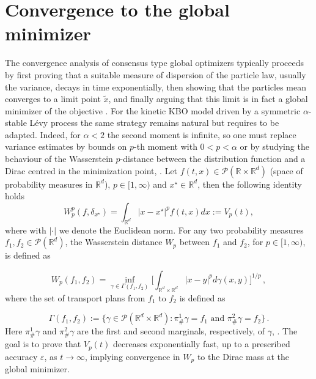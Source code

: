 \documentclass[11pt,handout]{article}%
\numberwithin{equation}{section}
\newcommand{\R}{\mathbb R}
\theoremstyle{definition}
\begin{document}
\section{Convergence to the global minimizer}\label{sec:convergence} 
The convergence analysis of consensus type global optimizers typically proceeds by first proving that a suitable measure of dispersion of the particle law, usually the variance,   decays in time exponentially, then showing that the particles mean converges to a limit point $\tilde{x}$, and finally arguing that this limit is in fact a global minimizer of the objective \cite{PTTM2017,benfenati2022binary}. 
For the kinetic KBO model driven by a symmetric $\alpha$-stable L\'evy process the same strategy remains natural but requires to be adapted. Indeed, for $\alpha<2$ the second moment is infinite, so one must replace variance estimates by bounds on $p$-th moment with $0<p<\alpha$ or by studying the behaviour of the Wasserstein $p$-distance between the distribution function and a Dirac centred in the minimization point, \cite{fornasier2024consensus}. Let $f(t,x) \in \mathcal{P}(\R\times \R^d)$ (space of probability measures in $\R^d$), $p \in [1, \infty)$ and $x^\star \in \R^d$, then the following identity holds
\begin{equation}\label{eq:Vp}
	W_p^p(f,\delta_{x^\star}) =   \int_{\R^d} |x - x^\star|^p f(t,x) dx := V_p(t),
\end{equation}
where with $\vert\cdot \vert$ we denote the Euclidean norm.
For any two probability measures $f_1,f_2 \in \mathcal{P} (\R^d)$, the Wasserstein distance $W_p$ between $f_1$ and $f_2$, for $p \in [1, \infty)$, is defined as

\[
W_p (f_1,f_2) = \inf_{\gamma \in \Gamma(f_1,f_2)} \bigg[ \int_{\R^d\times\R^d} |x - y|^p d \gamma(x,y) \bigg]^{1/p} \, ,
\]
where the set of transport plans from $f_1$ to $f_2$ is defined as

\[
\Gamma(f_1,f_2) := \big\{ \gamma \in \mathcal{P}(\R^d \times \R^d) : \pi^1_\# \gamma = f_1 \text{ and } \pi^2_\# \gamma = f_2 \big\}\, .
\]
Here $\pi^1_\# \gamma$ and $\pi^2_\# \gamma$ are the first and second marginals, respectively, of $\gamma$, \cite{ambrosio2008gradient}. The goal is to prove that $V_p(t)$ decreases exponentially fast, up to a prescribed accuracy $\varepsilon$, as $t \to \infty$, implying convergence in $W_p$ to the Dirac mass at the global minimizer. 
\end{document}
